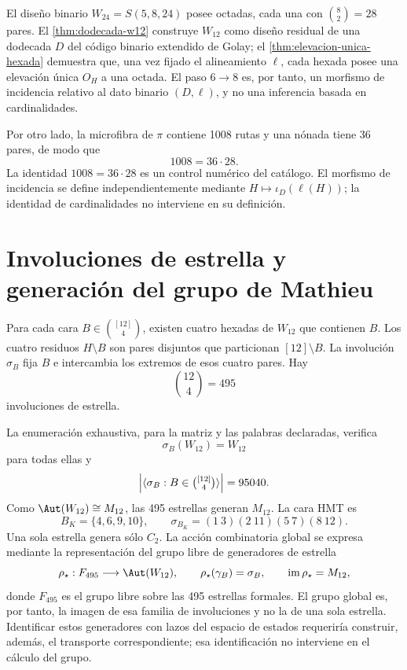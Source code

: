 El diseño binario \(W_{24}=S(5,8,24)\) posee octadas, cada una con
\(\binom82=28\) pares. El \cref{thm:dodecada-w12} construye
\(W_{12}\) como diseño residual de una dodecada \(D\) del código binario
extendido de Golay; el \cref{thm:elevacion-unica-hexada} demuestra que, una
vez fijado el alineamiento \(\ell\), cada hexada posee una elevación única
\(O_H\) a una octada. El paso \(6\to8\) es, por tanto, un morfismo de
incidencia relativo al dato binario \((D,\ell)\), y no una inferencia basada
en cardinalidades.

Por otro lado, la microfibra de \(\pi\) contiene 1008 rutas y una nónada tiene
36 pares, de modo que
\[
1008=36\cdot28.
\]
La identidad \(1008=36\cdot28\) es un control numérico del catálogo. El
morfismo de incidencia se define independientemente mediante
\(H\mapsto\iota_D(\ell(H))\); la identidad de cardinalidades no interviene en
su definición.

\section{Involuciones de estrella y generación del grupo de Mathieu}

Para cada cara \(B\in\binom{[12]}4\), existen cuatro hexadas de \(W_{12}\)
que contienen \(B\). Los cuatro residuos \(H\setminus B\) son pares disjuntos
que particionan \([12]\setminus B\). La involución \(\sigma_B\) fija \(B\)
e intercambia los extremos de esos cuatro pares. Hay
\[
\binom{12}{4}=495
\]
involuciones de estrella.

La enumeración exhaustiva, para la matriz y las palabras declaradas, verifica
\[
\sigma_B(W_{12})=W_{12}
\]
para todas ellas y
\[
\left|\langle\sigma_B:B\in\tbinom{[12]}4\rangle\right|=95040.
\]
Como \(\Aut(W_{12})\cong M_{12}\), las 495 estrellas generan \(M_{12}\).
La cara HMT es
\[
B_K=\{4,6,9,10\},
\qquad
\sigma_{B_K}=(1\ 3)(2\ 11)(5\ 7)(8\ 12).
\]
Una sola estrella genera sólo \(C_2\). La acción combinatoria global se
expresa mediante la representación del grupo libre de generadores de estrella
\[
\rho_\star:F_{495}\longrightarrow\Aut(W_{12}),
\qquad
\rho_\star(\gamma_B)=\sigma_B,
\qquad
\operatorname{im}\rho_\star=M_{12},
\]
donde \(F_{495}\) es el grupo libre sobre las 495 estrellas formales. El grupo
global es, por tanto, la imagen de esa familia de involuciones y no la de una
sola estrella. Identificar estos generadores con lazos del espacio de estados
requeriría construir, además, el transporte correspondiente; esa
identificación no interviene en el cálculo del grupo.

